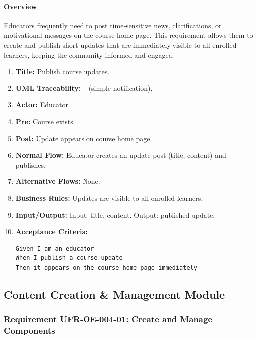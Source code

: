 \paragraph{Overview}
Educators frequently need to post time‑sensitive news, clarifications, or motivational messages on the course home page. This requirement allows them to create and publish short updates that are immediately visible to all enrolled learners, keeping the community informed and engaged.
\begin{enumerate}[label=\textbf{\arabic*.}]
\item \textbf{Title:} Publish course updates.
\item \textbf{UML Traceability:} – (simple notification).
\item \textbf{Actor:} Educator.
\item \textbf{Pre:} Course exists.
\item \textbf{Post:} Update appears on course home page.
\item \textbf{Normal Flow:} Educator creates an update post (title, content) and publishes.
\item \textbf{Alternative Flows:} None.
\item \textbf{Business Rules:} Updates are visible to all enrolled learners.
\item \textbf{Input/Output:} Input: title, content. Output: published update.
\item \textbf{Acceptance Criteria:}
    \begin{verbatim}
Given I am an educator
When I publish a course update
Then it appears on the course home page immediately
    \end{verbatim}
\end{enumerate}

\subsection{Content Creation \& Management Module}
\subsubsection{Requirement UFR-OE-004-01: Create and Manage Components}

